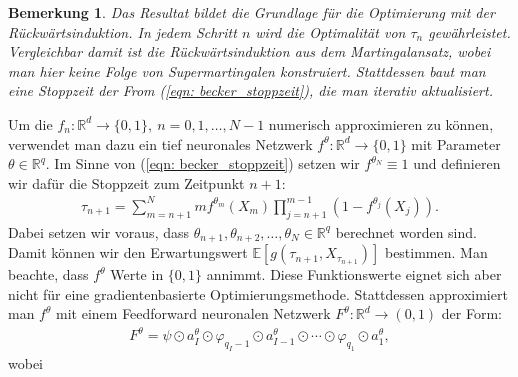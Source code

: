 \documentclass[12pt,titlepage,headsepline]{article}
\newtheorem*{bemerkung*}{Bemerkung}
\begin{document}
      \begin{bemerkung*}
        \textup{
        Das Resultat bildet die Grundlage für die Optimierung mit der Rückwärtsinduktion. In jedem Schritt $n$ wird die Optimalität von $\tau_n$ gewährleistet. Vergleichbar damit ist die Rückwärtsinduktion aus dem Martingalansatz, wobei man hier keine Folge von Supermartingalen konstruiert. Stattdessen baut man eine Stoppzeit der From (\ref{eqn: becker_stoppzeit}), die man iterativ aktualisiert.
        }
      \end{bemerkung*}
      \hfill\break
      Um die $f_n:\mathbb{R}^d \rightarrow \{0,1\}, \ n=0,1,\ldots,N-1$ numerisch approximieren zu können, verwendet man dazu ein tief neuronales Netzwerk $f^{\theta}:\mathbb{R}^d \rightarrow \{0,1\}$ mit Parameter $\theta \in \mathbb{R}^q$. Im Sinne von (\ref{eqn: becker_stoppzeit}) setzen wir $f^{\theta_N} \equiv 1$ und definieren wir dafür die Stoppzeit zum Zeitpunkt $n+1$:
      \begin{align*}
        \tau_{n+1} = \sum_{m={n+1}}^N mf^{\theta_m}(X_m)\prod_{j={n+1}}^{m-1}(1-f^{\theta_j}(X_j)).
      \end{align*}
      Dabei setzen wir voraus, dass $\theta_{n+1},\theta_{n+2},\ldots,\theta_{N} \in \mathbb{R}^q$ berechnet worden sind. Damit können wir den Erwartungswert $  \mathbb{E}[g(\tau_{n+1},X_{\tau_{n+1}})]$ bestimmen.
      \hfill\break
      Man beachte, dass $f^{\theta}$ Werte in $\{0,1\}$ annimmt. Diese Funktionswerte eignet sich aber nicht für eine gradientenbasierte Optimierungsmethode. Stattdessen approximiert man $f^{\theta}$ mit einem Feedforward neuronalen Netzwerk $F^{\theta}:\mathbb{R}^d \rightarrow (0,1)$ der Form:
      \begin{align*}
        F^{\theta} = \psi \odot a^{\theta}_I \odot \varphi_{q_I-1} \odot a^{\theta}_{I-1} \odot \cdots \odot \varphi_{q_1} \odot a^{\theta}_1,
      \end{align*}
      wobei
\end{document}
